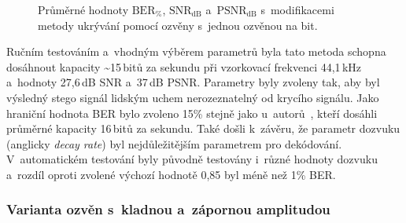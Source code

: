 \begin{figure}[H]
    \table
    \centering
    \caption{Průměrné hodnoty $\mathrm{BER}_{\%}$, $\mathrm{SNR}_\mathrm{dB}$
    a~$\mathrm{PSNR}_\mathrm{dB}$ s~modifikacemi metody ukrývání pomocí
    ozvěny s~jednou ozvěnou na bit.}
    \label{pic:modifications-mean-values-echo-single}
\end{figure}

Ručním testováním a~vhodným výběrem parametrů byla tato metoda schopna
dosáhnout kapacity \textasciitilde15\,bitů za sekundu při vzorkovací frekvenci
44,1\,kHz a~hodnoty 27,6\,dB SNR a~37\,dB PSNR. Parametry byly zvoleny tak, aby
byl výsledný stego signál lidským uchem nerozeznatelný od krycího signálu. Jako
hraniční hodnota BER bylo zvoleno 15\% stejně jako u~autorů~\cite{Gruhl1996},
kteří dosáhli průměrné kapacity 16\,bitů za sekundu. Také došli k~závěru, že
parametr dozvuku (anglicky \textit{decay rate}) byl nejdůležitějším parametrem
pro dekódování. V~automatickém testování byly původně testovány i~různé hodnoty
dozvuku a~rozdíl oproti zvolené výchozí hodnotě 0,85 byl méně než 1\% BER.

\subsubsection*{Varianta ozvěn s~kladnou a~zápornou amplitudou}

